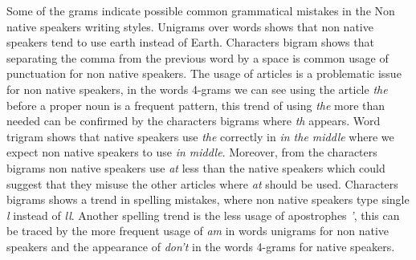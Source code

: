 \documentclass[11pt]{article}
\begin{document}
Some of the grams indicate possible common grammatical mistakes in the Non native speakers writing styles. Unigrams over words shows that non native speakers tend to use earth instead of Earth. Characters bigram shows that separating the comma from the previous word by a space is common usage of punctuation for non native speakers.
The usage of articles is a problematic issue for non native speakers, in the words 4-grams we can see using the article \emph{the} before a proper noun is a frequent pattern, this trend of using \emph{the} more than needed can be confirmed by the characters bigrams where \emph{th} appears. Word trigram shows that native speakers use \emph{the} correctly in \emph{in the middle} where we expect non native speakers to use \emph{in middle}.
Moreover, from the characters bigrams non native speakers use \emph{at} less than the native speakers which could suggest that they misuse the other articles where \emph{at} should be used. Characters bigrams shows a trend in spelling mistakes, where non native speakers type single \emph{l} instead of \emph{ll}. Another spelling trend is the less usage of apostrophes \emph{'}, this can be traced by the more frequent usage of \emph{am} in words unigrams for non native speakers and the appearance of \emph{don't} in the words 4-grams for native speakers.
\end{document}
